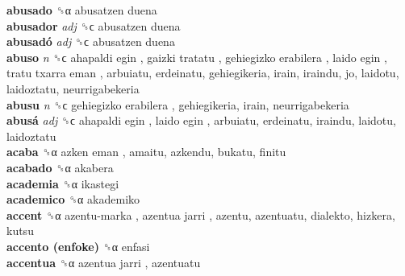 \textbf{abusado} ␝α   abusatzen duena   \\
\textbf{abusador} \emph{adj}  ␝ϲ   abusatzen duena   \\
\textbf{abusadó} \emph{adj}  ␝ϲ   abusatzen duena   \\
\textbf{abuso} \emph{n}  ␝ϲ   ahapaldi egin ,  gaizki tratatu ,  gehiegizko erabilera ,  laido egin ,  tratu txarra eman , arbuiatu, erdeinatu, gehiegikeria, irain, iraindu, jo, laidotu, laidoztatu, neurrigabekeria  \\
\textbf{abusu} \emph{n}  ␝ϲ   gehiegizko erabilera , gehiegikeria, irain, neurrigabekeria  \\
\textbf{abusá} \emph{adj}  ␝ϲ   ahapaldi egin ,  laido egin , arbuiatu, erdeinatu, iraindu, laidotu, laidoztatu  \\
\textbf{acaba} ␝α   azken eman , amaitu, azkendu, bukatu, finitu  \\
\textbf{acabado} ␝α  akabera  \\
\textbf{academia} ␝α  ikastegi  \\
\textbf{academico} ␝α  akademiko  \\
\textbf{accent} ␝α   azentu-marka ,  azentua jarri , azentu, azentuatu, dialekto, hizkera, kutsu  \\
\textbf{accento (enfoke)} ␝α  enfasi  \\
\textbf{accentua} ␝α   azentua jarri , azentuatu  \\
